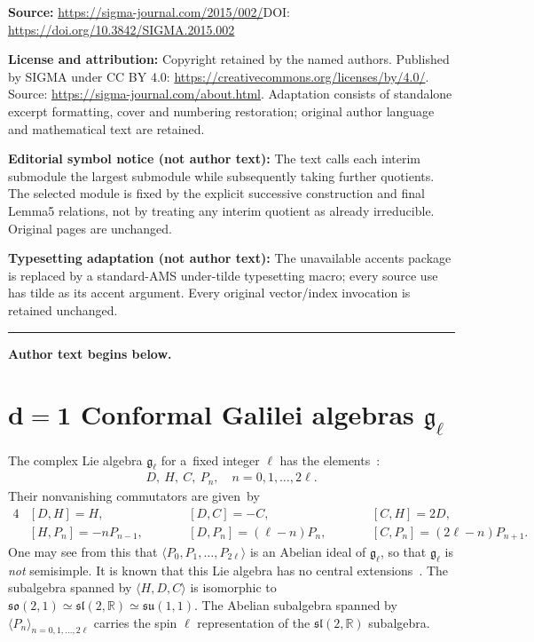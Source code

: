 \documentclass[11pt]{article}
\numberwithin{equation}{section}
\begin{document}
\noindent\textbf{Source:} \url{https://sigma-journal.com/2015/002/}\quad DOI: \url{https://doi.org/10.3842/SIGMA.2015.002}\par
\noindent\textbf{License and attribution:} Copyright retained by the named authors. Published by SIGMA under CC BY 4.0: \url{https://creativecommons.org/licenses/by/4.0/}. Source: \url{https://sigma-journal.com/about.html}. Adaptation consists of standalone excerpt formatting, cover and numbering restoration; original author language and mathematical text are retained.\par
\noindent\textbf{Editorial symbol notice (not author text):} The text calls each interim submodule the largest submodule while subsequently taking further quotients. The selected module is fixed by the explicit successive construction and final Lemma5 relations, not by treating any interim quotient as already irreducible. Original pages are unchanged.\par
\noindent\textbf{Typesetting adaptation (not author text):} The unavailable accents package is replaced by a standard-AMS under-tilde typesetting macro; every source use has tilde as its accent argument. Every original vector/index invocation is retained unchanged.\par
\medskip\hrule\medskip\noindent\textbf{Author text begins below.}\par
\setcounter{section}{1}
\setcounter{subsection}{0}
\setcounter{subsubsection}{0}
\setcounter{equation}{0}
\section[$d=1$ Conformal Galilei algebras ${\mathfrak g}_{\ell}$]{$\boldsymbol{d=1}$ Conformal Galilei algebras $\boldsymbol{{\mathfrak g}_{\ell}}$}

The complex Lie algebra $ {\mathfrak g}_{\ell} $ for a~f\/ixed integer $ \ell $ has the elements~\cite{NdORM1}:
\begin{gather*}
D, \ H, \ C, \ P_n, \quad n = 0, 1,   \dots,   2\ell.
\end{gather*}
Their nonvanishing commutators are given~by
\begin{alignat}{4}
& [D, H] = H, \qquad & & [D, C] = - C, \qquad & & [C, H] = 2D,& \nonumber\\
& [H, P_n] = -n P_{n-1}, \qquad & & [D, P_n] = (\ell-n) P_n, \qquad & & [C, P_n] = (2\ell-n) P_{n+1}.&\label{nonvanishing-commutators}
\end{alignat}
One may see from this that $ \langle   P_0, P_1, \dots, P_{2\ell}   \rangle $ is an Abelian ideal of $ {\mathfrak
g}_{\ell} $, so that $ {\mathfrak g}_{\ell} $ is \textit{not} semisimple.
It is known that this Lie algebra has no central extensions~\cite{MT}.
The subalgebra spanned by $ \langle
 H, D, C
\rangle $ is isomorphic to $ {\mathfrak{so}}(2,1) \simeq {\mathfrak{sl}}(2,{\mathbb R}) \simeq {\mathfrak{su}}(1,1)$.
The Abelian subalgebra spanned by $ \langle
P_n
\rangle_{n=0, 1, \dots, 2\ell} $ carries the spin $ \ell $ representation of the $ {\mathfrak{sl}}(2,{\mathbb R})$
subalgebra.
\end{document}
